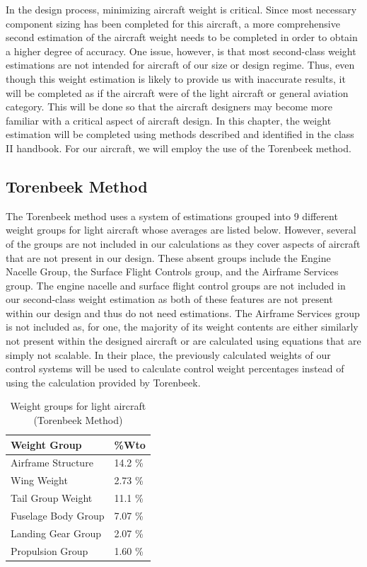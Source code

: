 \documentclass[12pt]{report}
\begin{document}
In the design process, minimizing aircraft weight is critical. Since most necessary component sizing has been completed for this aircraft, a more comprehensive second estimation of the aircraft weight needs to be completed in order to obtain a higher degree of accuracy. One issue, however, is that most second-class weight estimations are not intended for aircraft of our size or design regime. Thus, even though this weight estimation is likely to provide us with inaccurate results, it will be completed as if the aircraft were of the light aircraft or general aviation category. This will be done so that the aircraft designers may become more familiar with a critical aspect of aircraft design. In this chapter, the weight estimation will be completed using methods described and identified in the class II handbook. For our aircraft, we will employ the use of the Torenbeek method.

\subsection{Torenbeek Method}

The Torenbeek method uses a system of estimations grouped into 9 different weight groups for light aircraft whose averages are listed below. However, several of the groups are not included in our calculations as they cover aspects of aircraft that are not present in our design. These absent groups include the Engine Nacelle Group, the Surface Flight Controls group, and the Airframe Services group. The engine nacelle and surface flight control groups are not included in our second-class weight estimation as both of these features are not present within our design and thus do not need estimations. The Airframe Services group is not included as, for one, the majority of its weight contents are either similarly not present within the designed aircraft or are calculated using equations that are simply not scalable. In their place, the previously calculated weights of our control systems will be used to calculate control weight percentages instead of using the calculation provided by Torenbeek.

\begin{table}[h!]
	\centering
	\begin{tabular}{|l|l|}
		\hline
		\textbf{Weight Group} & \textbf{\%Wto} \\ \hline
		Airframe Structure & 14.2 \% \\ \hline
		Wing Weight & 2.73 \% \\ \hline
		Tail Group Weight & 11.1 \% \\ \hline
		Fuselage Body Group & 7.07 \% \\ \hline
		Landing Gear Group & 2.07 \% \\ \hline
		Propulsion Group & 1.60 \% \\ \hline
	\end{tabular}
	\caption{Weight groups for light aircraft (Torenbeek Method)}
\end{table}
\end{document}
